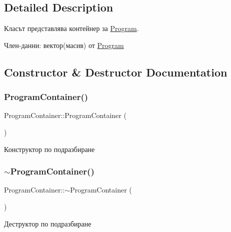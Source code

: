 \subsection{Detailed Description}
Класът представлява контейнер за \hyperlink{class_program}{Program}. 

Член-\/данни\+: вектор(масив) от \hyperlink{class_program}{Program} 

\subsection{Constructor \& Destructor Documentation}
\mbox{\label{class_program_container_a1be740ee44808c1933d74eb7a44d1a17}} 
\subsubsection{\texorpdfstring{Program\+Container()}{ProgramContainer()}}
{\footnotesize\ttfamily Program\+Container\+::\+Program\+Container (\begin{DoxyParamCaption}{ }\end{DoxyParamCaption})\hspace{0.3cm}{\ttfamily [default]}}



Конструктор по подразбиране 

\mbox{\label{class_program_container_aa60717707c10a8be7c1da4b36f78a88f}} 
\subsubsection{\texorpdfstring{$\sim$\+Program\+Container()}{~ProgramContainer()}}
{\footnotesize\ttfamily Program\+Container\+::$\sim$\+Program\+Container (\begin{DoxyParamCaption}{ }\end{DoxyParamCaption})\hspace{0.3cm}{\ttfamily [default]}}



Деструктор по подразбиране 



